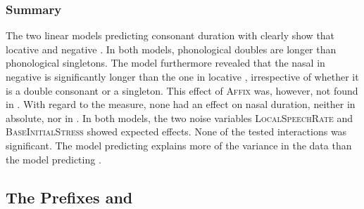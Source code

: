\subsubsection{Summary}


The two linear models predicting consonant duration with  clearly show that locative and negative  . In both models, phonological doubles are longer than phonological singletons. 
The  model furthermore revealed that the nasal in negative  is significantly longer than the one in locative , irrespective of whether it is a double consonant or a singleton. This effect of \textsc{Affix} was, however, not found in .
With regard to the  measure, none had an effect on nasal duration, neither in absolute, nor in . 
In both models, the two noise variables \textsc{LocalSpeechRate} and \textsc{BaseInitialStress} showed expected effects. None of the tested interactions was significant. 
The model predicting  explains more of the variance in the data than the model predicting . 



\subsection{The Prefixes  and } \label{corpus un in}


